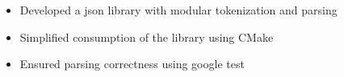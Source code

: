 
\begin{itemize}
  \item Developed a json library with modular tokenization and parsing
  \item Simplified consumption of the library using CMake
  \item Ensured parsing correctness using google test
\end{itemize}
